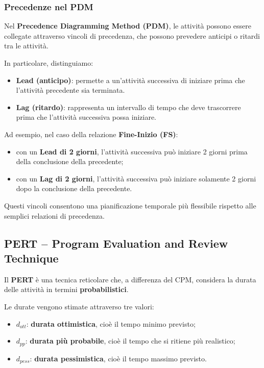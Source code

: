 \subsubsection*{Precedenze nel PDM}

\noindent Nel \textbf{Precedence Diagramming Method (PDM)}, le attività
possono essere collegate attraverso vincoli di precedenza,
che possono prevedere anticipi o ritardi tra le attività.

\medskip

\noindent In particolare, distinguiamo:

\begin{itemize}
    \item \textbf{Lead (anticipo)}: permette a un'attività
    successiva di iniziare prima che l'attività precedente
    sia terminata.

    \item \textbf{Lag (ritardo)}: rappresenta un intervallo
    di tempo che deve trascorrere prima che l'attività
    successiva possa iniziare.
\end{itemize}

\noindent Ad esempio, nel caso della relazione
\textbf{Fine-Inizio (FS)}:

\begin{itemize}
    \item con un \textbf{Lead di 2 giorni}, l'attività successiva
    può iniziare 2 giorni prima della conclusione della precedente;

    \item con un \textbf{Lag di 2 giorni}, l'attività successiva
    può iniziare solamente 2 giorni dopo la conclusione
    della precedente.
\end{itemize}

\noindent Questi vincoli consentono una pianificazione
temporale più flessibile rispetto alle semplici
relazioni di precedenza.


\subsection{PERT -- Program Evaluation and Review Technique}

\noindent Il \textbf{PERT} è una tecnica reticolare che,
a differenza del CPM, considera la durata delle attività
in termini \textbf{probabilistici}.

\medskip

\noindent Le durate vengono stimate attraverso tre valori:

\begin{itemize}
    \item $d_{ott}$: \textbf{durata ottimistica},
    cioè il tempo minimo previsto;

    \item $d_{pp}$: \textbf{durata più probabile},
    cioè il tempo che si ritiene più realistico;

    \item $d_{pess}$: \textbf{durata pessimistica},
    cioè il tempo massimo previsto.
\end{itemize}

